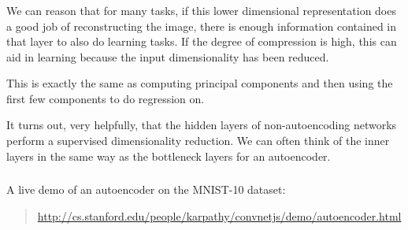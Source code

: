 \documentclass[xetex,mathserif,serif,aspectratio=169]{beamer}
\begin{document}
\begin{frame}[fragile] \frametitle{} \oldB \small


We can reason that for many tasks, if this lower dimensional representation
does a good job of reconstructing the image, there is enough information
contained in that layer to also do learning tasks. If the degree of compression
is high, this can aid in learning because the input dimensionality has been
reduced.

\pause This is exactly the same as computing principal components and then using
the first few components to do regression on.

\pause It turns out, very helpfully, that the hidden layers of non-autoencoding
networks perform a supervised dimensionality reduction. We can often think of
the inner layers in the same way as the bottleneck layers for an autoencoder.

\end{frame}

\begin{frame}[fragile] \frametitle{} \oldB \small


A live demo of an autoencoder on the MNIST-10 dataset:
\begin{quote}
\url{http://cs.stanford.edu/people/karpathy/convnetjs/demo/autoencoder.html}
\end{quote}

\end{frame}
\end{document}
